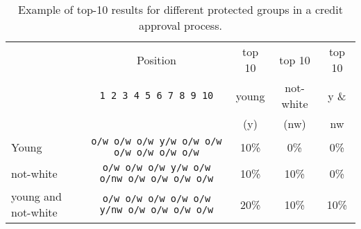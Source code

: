 \begin{table}[t]
	\caption{Example of top-10 results for different protected groups in a credit approval process.
		\label{tbl:multinomial_intro_example}}
	
	\centering\small\begin{tabular}{lcccc}\toprule
		& Position					  & top 10 & top 10  & top 10 \\
		& \texttt{1 2 3 4 5 6 7 8 9 10} & young & not-white & y \& \\
		&                               &  (y)  & (nw)  &  nw \\
		\midrule
		Young  & \texttt{o/w o/w o/w y/w o/w o/w o/w o/w o/w o/w} & 10\% & 0\% & 0\% \\
		not-white & \texttt{o/w o/w o/w y/w o/w o/nw o/w o/w o/w o/w} & 10\% & 10\% & 0\% \\
		young and not-white & \texttt{o/w o/w o/w o/w o/w y/nw o/w o/w o/w o/w} & 20\% & 10\% & 10\% \\
		\bottomrule
	\end{tabular}
	
\end{table}


